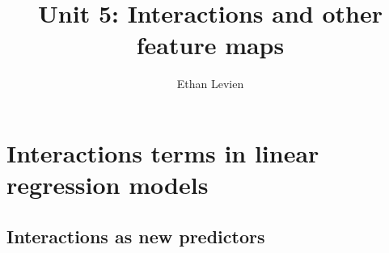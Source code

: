 

\setcounter{unit}{5}
\setcounter{section}{0}





\title{Unit 5: Interactions and other feature maps}
\author{Ethan Levien}
\maketitle
\tableofcontents




\section{Interactions terms in linear regression models}
\subsection{Interactions as new predictors}

